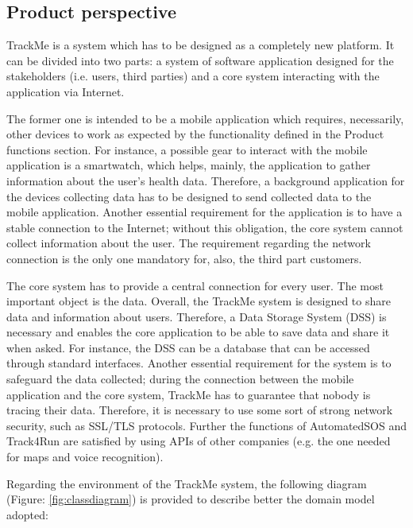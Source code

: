 \subsection{Product perspective}
TrackMe is a system which has to be designed as a completely new platform. It can be divided into 
two parts: a system of software application designed for the stakeholders (i.e. users, third parties) and a 
core system interacting with the application via Internet. 
\par
The former one is intended to be a mobile application which requires, necessarily, other devices to work 
as expected by the functionality defined in the Product functions section. For instance, a possible gear 
to interact with the mobile application is a smartwatch, which helps, mainly, the application to 
gather information about the user's health data. Therefore, a background application for the devices collecting data has to 
be designed to send collected data to the mobile application. Another essential requirement for the application is to have a 
stable connection to the Internet; without this obligation, the core system cannot 
collect information about the user. The requirement regarding the network connection is the only one mandatory for, also, the third part customers. 
\par
The core system has to provide a central connection for every user. The most important object is the data. Overall, the TrackMe system is designed to share data and 
information about users. Therefore, a Data Storage System (DSS) is necessary and enables the 
core application to be able to save data and share it when asked. For instance, the DSS can be a 
database that can be accessed through standard interfaces. Another essential 
requirement for the system is to safeguard the data collected; during the connection between the 
mobile application and the core system, TrackMe has to guarantee that nobody is tracing their data. 
Therefore, it is necessary to use some sort of strong network security, such as SSL/TLS protocols. 
Further the functions of AutomatedSOS and Track4Run are satisfied by using APIs of other companies 
(e.g. the one needed for maps and voice recognition).
\\\par
Regarding the environment of the TrackMe system, the following diagram (Figure: \ref{fig:classdiagram}) 
is provided to describe better the domain model adopted:\\

